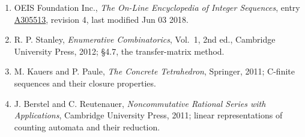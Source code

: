 \documentclass[11pt]{article}
\theoremstyle{definition}
\begin{document}
\begin{enumerate}

\item OEIS Foundation Inc., \emph{The On-Line Encyclopedia of Integer Sequences}, entry \href{https://oeis.org/A305513}{A305513}, revision 4, last modified Jun 03 2018.

\item R. P. Stanley, \emph{Enumerative Combinatorics}, Vol.~1, 2nd ed., Cambridge University Press, 2012; \S4.7, the transfer-matrix method.

\item M. Kauers and P. Paule, \emph{The Concrete Tetrahedron}, Springer, 2011; C-finite sequences and their closure properties.

\item J. Berstel and C. Reutenauer, \emph{Noncommutative Rational Series with Applications}, Cambridge University Press, 2011; linear representations of counting automata and their reduction.

\end{enumerate}
\end{document}
